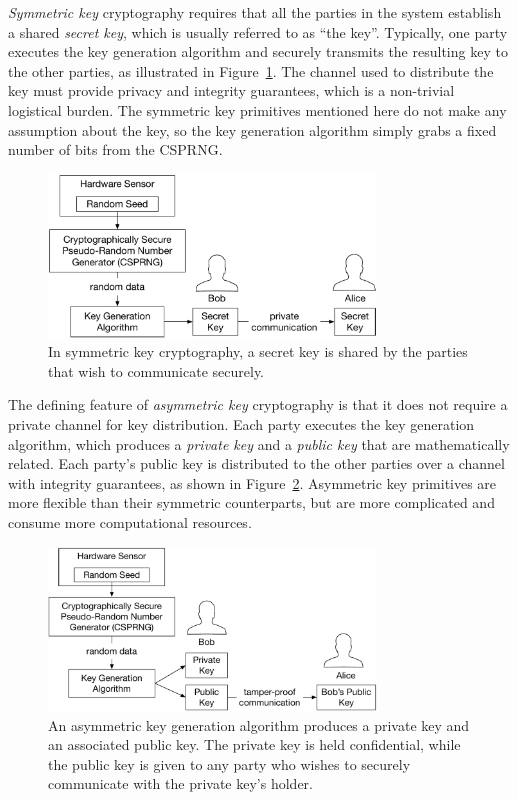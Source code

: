 \textit{Symmetric key} cryptography requires that all the parties in the system
establish a shared \textit{secret key}, which is usually referred to as ``the
key''. Typically, one party executes the key generation algorithm and securely
transmits the resulting key to the other parties, as illustrated in
Figure~\ref{fig:symmetric_key_generation}. The channel used to
distribute the key must provide privacy and integrity guarantees, which is a
non-trivial logistical burden. The symmetric key primitives mentioned here do
not make any assumption about the key, so the key generation algorithm simply
grabs a fixed number of bits from the CSPRNG.

\begin{figure}[hbt]
  \centering
  \includegraphics[width=87mm]{figures/symmetric_key_generation.pdf}
  \caption{
    In symmetric key cryptography, a secret key is shared by the parties that
    wish to communicate securely.
  }
  \label{fig:symmetric_key_generation}
\end{figure}

The defining feature of \textit{asymmetric key} cryptography is that it does not
require a private channel for key distribution. Each party executes the key
generation algorithm, which produces a \textit{private key} and a
\textit{public key} that are mathematically related. Each party's public key
is distributed to the other parties over a channel with integrity guarantees,
as shown in Figure~\ref{fig:asymmetric_key_generation}.
Asymmetric key primitives are more flexible than their symmetric counterparts,
but are more complicated and consume more computational resources.

\begin{figure}[hbt]
  \centering
  \includegraphics[width=87mm]{figures/asymmetric_key_generation.pdf}
  \caption{
    An asymmetric key generation algorithm produces a private key and an
    associated public key. The private key is held confidential, while the
    public key is given to any party who wishes to securely communicate with
    the private key's holder.
  }
  \label{fig:asymmetric_key_generation}
\end{figure}


